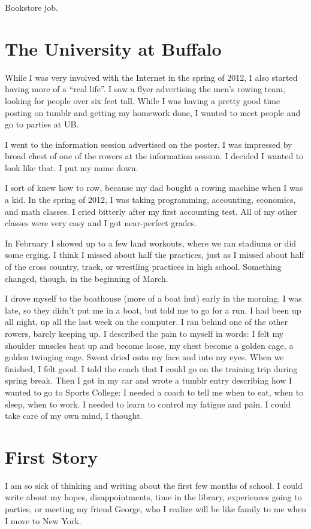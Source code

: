 \documentclass[12pt]{article}
\begin{document}
Bookstore job.

\section{The University at Buffalo}
While I was very involved with the Internet in the spring of 2012, I also
started having more of a ``real life''.  I saw a flyer advertising the men's
rowing team, looking for people over six feet tall.  While I was having a
pretty good time posting on tumblr and getting my homework done, I wanted to
meet people and go to parties at UB. 

I went to the information session advertised on the poster.  I was impressed by
 broad chest of one of the rowers at the information session.  I decided I
wanted to look like that.  I put my name down.

I sort of knew how to row, because my dad bought a rowing machine when I was a
kid.  In the spring of 2012, I was taking programming, accounting, economics, and
math classes.  I cried bitterly after my first accounting test.  All of my
other classes were very easy and I got near-perfect grades.

In February I showed up to a few land workouts, where we ran stadiums or did
some erging.  I think I missed about half the practices, just as I missed about
half of the cross country, track, or wrestling practices in high school.
Something changed, though, in the beginning of March.

I drove myself to the boathouse (more of a boat hut) early in the morning.  I
was late, so they didn't put me in a boat, but told me to go for a run.  I had
been up all night, up all the last week on the computer.  I ran behind one of
the other rowers, barely keeping up.  I described the pain to myself in words: I
felt my shoulder muscles heat up and become loose, my chest become a golden
cage, a golden twinging cage.  Sweat dried onto my face and into my eyes.  When
we finished, I felt good.  I told the coach that I could go on the training trip
during spring break.  Then I got in my car and wrote a tumblr entry describing
how I wanted to go to Sports College: I needed a coach to tell me when to eat,
when to sleep, when to work.  I needed to learn to control my fatigue and pain.
I could take care of my own mind, I thought.

\section{First Story}
I am so sick of thinking and writing about the first few months of school.  I
could write about my hopes, disappointments, time in the library, experiences
going to parties, or meeting my friend George, who I realize will be like family
to me when I move to New York. 
\end{document}
